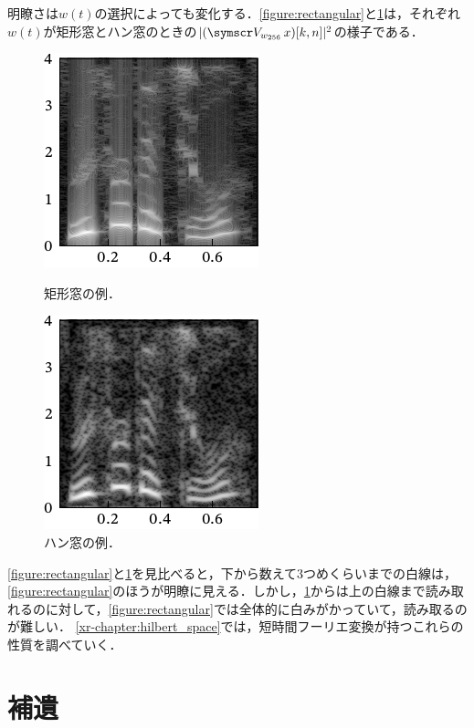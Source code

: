 \documentclass[../../main]{subfiles}
\begin{document}
明瞭さは\(w(t)\)の選択によっても変化する．\cref{figure:rectangular}と\cref{figure:hann}は，それぞれ\(w(t)\)が矩形窓とハン窓のときの\(\abs{(\stft{w_{256}}x)[k,n]}^2\)の様子である．

\begin{figure}[htbp]
  \begin{minipage}{\linewidth/2}
    \centering
    \includegraphics{figures/rectangular.pdf}
    \caption{矩形窓の例．}
    \label{figure:rectangular}
  \end{minipage}%
  \begin{minipage}{\linewidth/2}
    \centering
    \includegraphics{figures/hann.pdf}
    \caption{ハン窓の例．}
    \label{figure:hann}
  \end{minipage}
\end{figure}

\cref{figure:rectangular}と\cref{figure:hann}を見比べると，下から数えて3つめくらいまでの白線は，\cref{figure:rectangular}のほうが明瞭に見える．しかし，\cref{figure:hann}からは上の白線まで読み取れるのに対して，\cref{figure:rectangular}では全体的に白みがかっていて，読み取るのが難しい．
\cref{xr-chapter:hilbert_space}では，短時間フーリエ変換が持つこれらの性質を調べていく．

\section{補遺}
\end{document}
